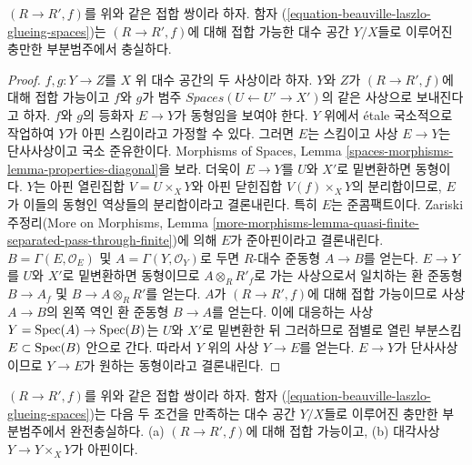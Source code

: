 \begin{lemma}
\label{lemma-glueing-f}
$(R \to R', f)$를 위와 같은 접합 쌍이라 하자. 함자
(\ref{equation-beauville-laszlo-glueing-spaces})는
$(R \to R', f)$에 대해 접합 가능한 대수 공간 $Y/X$들로 이루어진
충만한 부분범주에서 충실하다.
\end{lemma}

\begin{proof}
$f, g : Y \to Z$를 $X$ 위 대수 공간의 두 사상이라 하자.
$Y$와 $Z$가 $(R \to R', f)$에 대해 접합 가능이고 $f$와 $g$가 범주
$\textit{Spaces}(U \leftarrow U' \to X')$의 같은 사상으로 보내진다고 하자.
$f$와 $g$의 등화자 $E \to Y$가 동형임을 보여야 한다. $Y$ 위에서
\'etale 국소적으로 작업하여 $Y$가 아핀 스킴이라고 가정할 수 있다.
그러면 $E$는 스킴이고 사상 $E \to Y$는 단사사상이고 국소 준유한이다.
Morphisms of Spaces, Lemma
\ref{spaces-morphisms-lemma-properties-diagonal}을 보라. 더욱이
$E \to Y$를 $U$와 $X'$로 밑변환하면 동형이다. $Y$는 아핀 열린집합
$V = U \times_X Y$와 아핀 닫힌집합 $V(f) \times_X Y$의 분리합이므로,
$E$가 이들의 동형인 역상들의 분리합이라고 결론내린다. 특히 $E$는
준콤팩트이다. Zariski 주정리(More on Morphisms, Lemma
\ref{more-morphisms-lemma-quasi-finite-separated-pass-through-finite})에 의해
$E$가 준아핀이라고 결론내린다. $B = \Gamma(E, \mathcal{O}_E)$ 및
$A = \Gamma(Y, \mathcal{O}_Y)$로 두면 $R$-대수 준동형
$A \to B$를 얻는다. $E \to Y$를 $U$와 $X'$로 밑변환하면 동형이므로
$A \otimes_R R'_f$로 가는 사상으로서 일치하는 환 준동형
$B \to A_f$ 및 $B \to A \otimes_R R'$를 얻는다. $A$가
$(R \to R', f)$에 대해 접합 가능이므로 사상 $A \to B$의 왼쪽 역인
환 준동형 $B \to A$를 얻는다. 이에 대응하는 사상
$Y = \mathop{\mathrm{Spec}}(A) \to \mathop{\mathrm{Spec}}(B)$는 $U$와 $X'$로 밑변환한 뒤 그러하므로
점별로 열린 부분스킴 $E \subset \mathop{\mathrm{Spec}}(B)$ 안으로 간다. 따라서 $Y$ 위의
사상 $Y \to E$를 얻는다.
$E \to Y$가 단사사상이므로 $Y \to E$가 원하는 동형이라고 결론내린다.
\end{proof}

\begin{lemma}
\label{lemma-glueing-ff}
$(R \to R', f)$를 위와 같은 접합 쌍이라 하자. 함자
(\ref{equation-beauville-laszlo-glueing-spaces})는 다음 두 조건을
만족하는 대수 공간 $Y/X$들로 이루어진 충만한 부분범주에서 완전충실하다.
(a) $(R \to R', f)$에 대해 접합 가능이고, (b) 대각사상
$Y \to Y \times_X Y$가 아핀이다.
\end{lemma}

